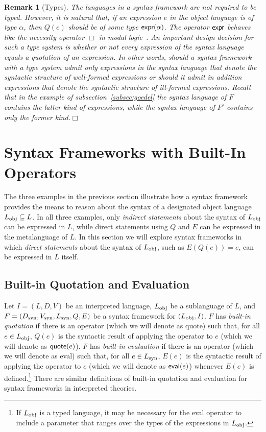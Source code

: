 \documentclass[11pt,fleqn]{article}
\newcommand{\bsp}{\begin{sloppypar}}
\newcommand{\esp}{\end{sloppypar}}
\newcommand{\mname}[1]{\mbox{\sf #1}}
\newtheorem{rem}[thm]{Remark}
\begin{document}
\begin{rem}[Types]\em
The languages in a syntax framework are not required to be typed.
However, it is natural that, if an expression $e$ in the object
language is of type $\alpha$, then $Q(e)$ should be of some type
$\mname{expr}(\alpha)$.  The operator $\mname{expr}$ behaves like the
necessity operator $\Box$ in modal logic~\cite{DaviesPfenning01}.  An
important design decision for such a type system is whether or not
every expression of the syntax language equals a quotation of an
expression.  In other words, should a syntax framework with a type
system admit only expressions in the syntax language that denote the
syntactic structure of well-formed expressions or should it admit in
addition expressions that denote the syntactic structure of ill-formed
expressions.  Recall that in the example of
subsection~\ref{subsec:goedel} the syntax language of $F$ contains the
latter kind of expressions, while the syntax language of $F'$ contains
only the former kind.\hfill$\Box$
\end{rem}

\section{Syntax Frameworks with Built-In Operators} \label{sec:built-in}

The three examples in the previous section illustrate how a syntax
framework provides the means to reason about the syntax of a
designated object language $L_{\rm obj} \subseteq L$.  In all three
examples, only \emph{indirect statements} about the syntax of $L_{\rm
  obj}$ can be expressed in $L$, while direct statements using $Q$ and
$E$ can be expressed in the metalanguage of $L$.  In this section we
will explore syntax frameworks in which \emph{direct statements} about
the syntax of $L_{\rm obj}$, such as $E(Q(e)) = e$, can be expressed
in $L$ itself.

\subsection{Built-in Quotation and Evaluation}

\bsp Let $I=(L,D,V)$ be an interpreted language, $L_{\rm obj}$ be a
sublanguage of $L$, and $F=(D_{\rm syn}, V_{\rm syn}, L_{\rm syn}, Q,
E)$ be a syntax framework for $(L_{\rm obj},I)$.  $F$ has
\emph{built-in quotation} if there is an operator (which we will
denote as \mname{quote}) such that, for all $e \in L_{\rm obj}$,
$Q(e)$ is the syntactic result of applying the operator to $e$ (which
we will denote as $\mname{quote}(e)$).  $F$ has \emph{built-in
  evaluation} if there is an operator (which we will denote as
\mname{eval}) such that, for all $e \in L_{\rm syn}$, $E(e)$ is the
syntactic result of applying the operator to $e$ (which we will denote
as $\mname{eval}(e)$) whenever $E(e)$ is defined.\footnote{If $L_{\rm
    obj}$ is a typed language, it may be necessary for the
  \mname{eval} operator to include a parameter that ranges over the
  types of the expressions in $L_{\rm obj}$.}  There are similar
definitions of built-in quotation and evaluation for syntax frameworks
in interpreted theories. \esp
\end{document}
